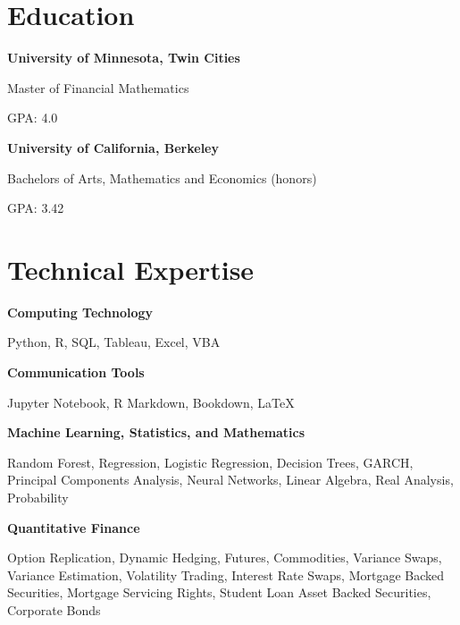 \documentclass[11pt,a4paper,]{awesome-cv}
\begin{document}
\normalsize

\hypertarget{education}{%
\section{Education}\label{education}}

\textbf{University of Minnesota, Twin Cities}

\vspace{-1ex}

Master of Financial Mathematics

\vspace{-1ex}

GPA: 4.0

\textbf{University of California, Berkeley}

\vspace{-1ex}

Bachelors of Arts, Mathematics and Economics (honors)

\vspace{-1ex}

GPA: 3.42

\hypertarget{technical-expertise}{%
\section{Technical Expertise}\label{technical-expertise}}

\textbf{Computing Technology}

\vspace{-1ex}

Python, R, SQL, Tableau, Excel, VBA

\textbf{Communication Tools}

\vspace{-1ex}

Jupyter Notebook, R Markdown, Bookdown, \LaTeX

\textbf{Machine Learning, Statistics, and Mathematics}

\vspace{-1ex}

Random Forest, Regression, Logistic Regression, Decision Trees, GARCH,
Principal Components Analysis, Neural Networks, Linear Algebra, Real
Analysis, Probability

\textbf{Quantitative Finance}

\vspace{-1ex}

Option Replication, Dynamic Hedging, Futures, Commodities, Variance
Swaps, Variance Estimation, Volatility Trading, Interest Rate Swaps,
Mortgage Backed Securities, Mortgage Servicing Rights, Student Loan
Asset Backed Securities, Corporate Bonds
\end{document}
